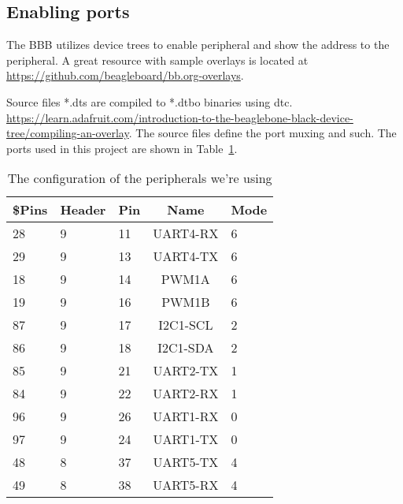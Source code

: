\documentclass{article}
\begin{document}
\subsection{Enabling ports}
The BBB utilizes device trees to enable peripheral and show the address to the peripheral. A great resource with sample overlays is located at \url{https://github.com/beagleboard/bb.org-overlays}. 

Source files *.dts are compiled to *.dtbo binaries using dtc. \url{https://learn.adafruit.com/introduction-to-the-beaglebone-black-device-tree/compiling-an-overlay}. The source files define the port muxing and such. The ports used in this project are shown in Table~\ref{tab:periph}. 

\begin{table}[H]
    \centering
    \begin{tabular}{lllcl}
        \$Pins & Header & Pin & Name & Mode \\ \hline
        28 & 9 & 11 & UART4-RX & 6\\ 
        29 & 9 & 13 & UART4-TX & 6 \\
        18 & 9 & 14 & PWM1A & 6 \\
        19 & 9 & 16 & PWM1B & 6 \\
        87 & 9 & 17 & I2C1-SCL & 2 \\
        86 & 9 & 18 & I2C1-SDA & 2 \\
        85 & 9 & 21 & UART2-TX & 1 \\
        84 & 9 & 22 & UART2-RX & 1 \\
        96 & 9 & 26 & UART1-RX & 0 \\
        97 & 9 & 24 & UART1-TX & 0 \\
        48 & 8 & 37 & UART5-TX & 4 \\
        49 & 8 & 38 & UART5-RX & 4 
    \end{tabular}
    \caption{The configuration of the peripherals we're using}
    \label{tab:periph}
\end{table}
\end{document}
